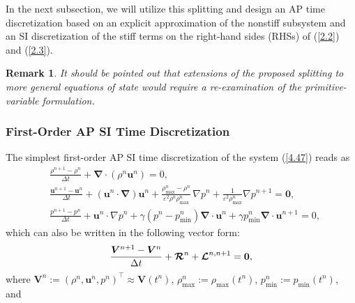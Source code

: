 \documentclass[A4paper,12pt,twoside]{article}
\newtheorem{remark}{Remark}[section]
\numberwithin{equation}{section}
\numberwithin{figure}{section}
\numberwithin{table}{section}
\def\bnabla{\bm{\nabla}}
\newcommand{\dt}{\Delta t}
\newcommand{\ve}{\varepsilon}
\newcommand\eref[1]{(\ref{#1})}
\begin{document}
In the next subsection, we will utilize this splitting and design an AP time discretization based on an explicit approximation of the
nonstiff subsystem and an SI discretization of the stiff terms on the right-hand sides (RHSs) of \eref{2.2} and \eref{2.3}.
{\color{blue}
\begin{remark}
It should be pointed out that extensions of the proposed splitting to more general equations of state would require a re-examination of the
primitive-variable formulation.
\end{remark}}

\subsubsection{First-Order AP SI Time Discretization}
The simplest first-order AP SI time discretization of the system \eref{4.47} reads as
\begin{equation}
\begin{aligned}
&\frac{\rho^{n+1}-\rho^n}{\dt}+\bnabla\!\cdot\!(\rho^n\bm u^n)=0,\\
&\frac{\bm u^{n+1}-\bm u^n}{\dt}+(\bm u^n\!\cdot\!\bnabla)\bm u^n+\frac{\rho_{\max}^n-\rho^n}{\ve^2\rho^n\rho_{\max}^n}\,\nabla p^n+
\frac{1}{\ve^2\rho_{\max}^n}\nabla p^{n+1}=\bm0,\\
&\frac{p^{n+1}-p^n}{\dt}+\bm u^n\!\cdot\!\nabla p^n+\gamma(p^n-p_{\min}^n)\bnabla\!\cdot\!\bm u^n+\gamma p_{\min}^n
\bnabla\!\cdot\!\bm u^{n+1}=0,
\end{aligned}
\label{4.8}
\end{equation}
which can also be written in the following vector form:
\begin{equation*}
\frac{\bm V^{n+1}-\bm V^n}{\dt}+\bm{{\cal R}}^n+\bm{{\cal L}}^{n,n+1}=\bm0,
\end{equation*}
where $\bm V^n:=(\rho^n,\bm u^n,p^n)^\top\approx\bm V(t^n)$, $\rho_{\max}^n:=\rho_{\max}(t^n)$, $p_{\min}^n:=p_{\min}(t^n)$, and 
\end{document}
